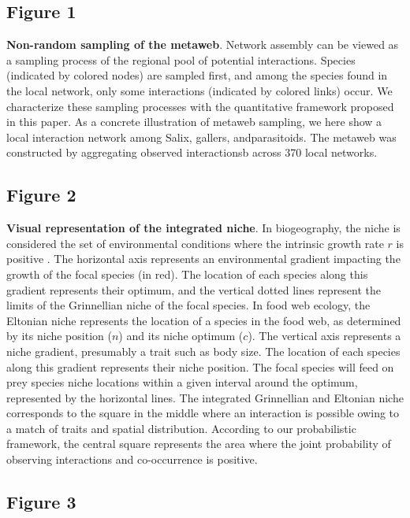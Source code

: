 \documentclass[12pt]{article}
\begin{document}
\subsection*{Figure 1}

\textbf{Non-random sampling of the metaweb}. Network assembly can be viewed as
a sampling process of the regional pool of potential interactions. Species
(indicated by colored nodes) are sampled first, and among the species found in
the local network, only some interactions (indicated by colored links) occur.
We characterize these sampling processes with the quantitative framework
proposed in this paper. As a concrete illustration of metaweb sampling, we
here show a local interaction network among Salix, gallers, andparasitoids.
The metaweb was constructed by aggregating observed interactionsb across 370
local networks.

\subsection*{Figure 2}

\textbf{Visual representation of the integrated niche}. In biogeography, the
niche is considered the set of environmental conditions where the intrinsic
growth rate $r$ is positive \citep{Holt2009}. The horizontal axis represents
an environmental gradient impacting the growth of the focal species (in red).
The location of each species along this gradient represents their optimum, and
the vertical dotted lines represent the limits of the Grinnellian niche of the
focal species. In food web ecology, the Eltonian niche represents the location
of a species in the food web, as determined by its niche position ($n$) and
its niche optimum ($c$). The vertical axis represents a niche gradient,
presumably a trait such as body size. The location of each species along this
gradient represents their niche position. The focal species will feed on prey
species niche locations within a given interval around the optimum,
represented by the horizontal lines. The integrated Grinnellian and Eltonian
niche corresponds to the square in the middle where an interaction is possible
owing to a match of traits and spatial distribution. According to our
probabilistic framework, the central square represents the area where the
joint probability of observing interactions and co-occurrence is positive.

\subsection*{Figure 3}
\end{document}
